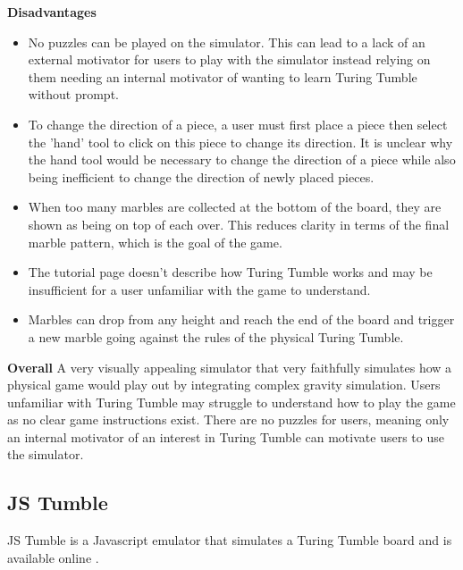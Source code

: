 \documentclass{l4proj}
\begin{document}
\textbf{Disadvantages}
\begin{itemize}
    \item No puzzles can be played on the simulator. This can lead to a lack of an external motivator for users to play with the simulator instead relying on them needing an internal motivator of wanting to learn Turing Tumble without prompt.
    \item To change the direction of a piece, a user must first place a piece then select the 'hand' tool to click on this piece to change its direction. It is unclear why the hand tool would be necessary to change the direction of a piece while also being inefficient to change the direction of newly placed pieces.
    \item When too many marbles are collected at the bottom of the board, they are shown as being on top of each over. This reduces clarity in terms of the final marble pattern, which is the goal of the game.
    \item The tutorial page doesn't describe how Turing Tumble works and may be insufficient for a user unfamiliar with the game to understand.
    \item Marbles can drop from any height and reach the end of the board and trigger a new marble going against the rules of the physical Turing Tumble.
\end{itemize}

\textbf{Overall}
A very visually appealing simulator that very faithfully simulates how a physical game would play out by integrating complex gravity simulation. Users unfamiliar with Turing Tumble may struggle to understand how to play the game as no clear game instructions exist. There are no puzzles for users, meaning only an internal motivator of an interest in Turing Tumble can motivate users to use the simulator.

\subsection{JS Tumble}
JS Tumble is a Javascript emulator that simulates a Turing Tumble board and is available online \cite{jstumble}.
\end{document}

